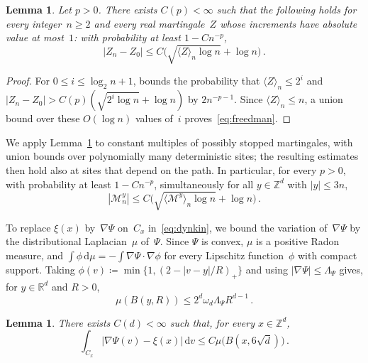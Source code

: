 \documentclass[11pt]{amsart}
\theoremstyle{plain}
\newtheorem{lemma}[theorem]{Lemma}
\theoremstyle{definition}
\newcommand{\Z}{\mathbb Z}
\newcommand{\R}{\mathbb R}
\newcommand{\gauge}{\Psi}
\newcommand{\dd}{\,\mathrm d}
\numberwithin{equation}{section}
\begin{document}
\begin{lemma}\label{lem:freedman}
Let $p>0$. There exists $C(p)<\infty$ such that the following holds for every integer~$n\geq2$ and every real martingale~$Z$ whose increments have absolute value at most~$1$: with probability at least $1-Cn^{-p}$,
\begin{equation}\label{eq:freedman}
|Z_n-Z_0|\leq C\bigl(\sqrt{\langle Z\rangle_n\log n}+\log n\bigr)\, .
\end{equation}
\end{lemma}

\begin{proof}
For $0\leq i\leq\log_2n+1$, \citet*[Theorem~1.6]{Freedman1975} bounds the probability that $\langle Z\rangle_n\leq2^i$ and $|Z_n-Z_0|>C(p)(\sqrt{2^i\log n}+\log n)$ by $2n^{-p-1}$. Since $\langle Z\rangle_n\leq n$, a union bound over these $O(\log n)$ values of~$i$ proves~\eqref{eq:freedman}.
\end{proof}

We apply Lemma~\ref{lem:freedman} to constant multiples of possibly stopped martingales, with union bounds over polynomially many deterministic sites; the resulting estimates then hold also at sites that depend on the path. In particular, for every $p>0$, with probability at least $1-Cn^{-p}$, simultaneously for all $y\in\Z^d$ with $|y|\leq3n$,
\begin{equation}\label{eq:localmart}
|\mathcal M_n^y|\leq C\bigl(\sqrt{\langle\mathcal M^y\rangle_n\log n}+\log n\bigr)\, .
\end{equation}

To replace $\xi(x)$ by~$\nabla\gauge$ on~$C_x$ in~\eqref{eq:dynkin}, we bound the variation of~$\nabla\gauge$ by the distributional Laplacian~$\mu$ of~$\gauge$. Since $\gauge$ is convex, $\mu$ is a positive Radon measure, and $\int\phi\dd\mu=-\int\nabla\gauge\cdot\nabla\phi$ for every Lipschitz function~$\phi$ with compact support. Taking $\phi(v)\coloneqq\min\{1,(2-|v-y|/R)_+\}$ and using $|\nabla \gauge|\leq\Lambda_\gauge$ gives, for $y\in\R^d$ and $R>0$,
\begin{equation}\label{eq:hessian-growth}
\mu(B(y,R))\leq2^d\omega_d\Lambda_\gauge R^{d-1}\, .
\end{equation}

\begin{lemma}\label{lem:cell}
There exists $C(d)<\infty$ such that, for every $x\in\Z^d$,
\begin{equation*}
\int_{C_x}|\nabla \gauge(v)-\xi(x)|\dd v\leq C\mu\bigl(B(x,6\sqrt d)\bigr)\, .
\end{equation*}
\end{lemma}
\end{document}
